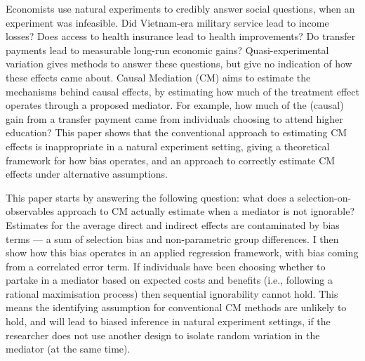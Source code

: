 Economists use natural experiments to credibly answer social questions, when an experiment was infeasible.
Did Vietnam-era military service lead to income losses?
Does access to health insurance lead to health improvements?
Do transfer payments  lead to measurable long-run economic gains?
Quasi-experimental variation gives methods to answer these questions, but give no indication of how these effects came about.
Causal Mediation (CM) aims to estimate the mechanisms behind causal effects, by estimating how much of the treatment effect operates through a proposed mediator.
For example, how much of the (causal) gain from a transfer payment came from individuals choosing to attend higher education?
This paper shows that the conventional approach to estimating CM effects is inappropriate in a natural experiment setting, giving a theoretical framework for how bias operates, and an approach to correctly estimate CM effects under alternative assumptions.

This paper starts by answering the following question: what does a selection-on-observables approach to CM actually estimate when a mediator is not ignorable?
Estimates for the average direct and indirect effects are contaminated by bias terms --- a sum of selection bias and non-parametric group differences.
I then show how this bias operates in an applied regression framework, with bias coming from a correlated error term.
If individuals have been choosing whether to partake in a mediator based on expected costs and benefits (i.e., following a rational maximisation process) then sequential ignorability cannot hold.
This means the identifying assumption for conventional CM methods are unlikely to hold, and will lead to biased inference in natural experiment settings, if the researcher does not use another design to isolate random variation in the mediator (at the same time).

